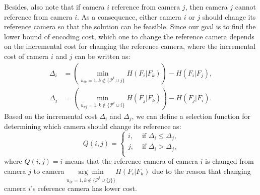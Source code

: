 Besides, also note that if camera $i$ reference from camera $j$, then camera $j$ cannot reference from camera $i$.
As a consequence, either camera $i$ or $j$ should change its reference camera so that the solution can be feasible.
Since our goal is to find the lower bound of encoding cost, which one to change the reference camera depends on the incremental cost for changing the reference camera, where the incremental cost of camera $i$ and $j$ can be written as:
\begin{align}
\Delta_i &= \left( \underset{u_{ik}=1, k \notin \{\mathcal{P}^t \cup j\}}{\min} H(F_i|F_k) \right) - H(F_i|F_j), \nonumber \\
\Delta_j &= \left( \underset{u_{kj}=1, k \notin \{\mathcal{P}^t \cup i\}}{\min} H(F_j|F_k) \right) - H(F_j|F_i).
\end{align}
Based on the incremental cost $\Delta_i$ and $\Delta_j$, we can define a selection function for determining which camera should change its reference as:
\begin{equation}
Q(i,j) = 
\left\{ \begin{array}{ll}
i,  &\text{ if $\Delta_i \leq \Delta_j$,} \\                  	   
j,  &\text{ if $\Delta_i > \Delta_j$,} \\
\end{array} \right.
\label{eq::selectionFunctionQ}
\end{equation}
where $Q(i,j) = i$ means that the reference camera of camera $i$ is changed from camera $j$ to camera $\underset{u_{ik}=1, k \notin \{\mathcal{P}^t \cup\{j\}\}}{\arg \min} H(F_i|F_k)$ due to the reason that changing camera $i$'s reference camera has lower cost.

